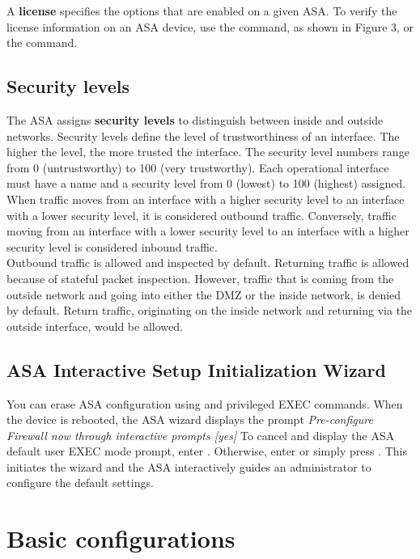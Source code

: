 A \textbf{license} specifies the options that are enabled on a given ASA. To verify the license information on an ASA device, use the  command, as shown in Figure 3, or the  command.\\

\subsection{Security levels}

The ASA assigns \textbf{security levels} to distinguish between inside and outside networks. Security levels define the level of trustworthiness of an interface. The higher the level, the more trusted the interface. The security level numbers range from 0 (untrustworthy) to 100 (very trustworthy). Each operational interface must have a name and a security level from 0 (lowest) to 100 (highest) assigned.\\

When traffic moves from an interface with a higher security level to an interface with a lower security level, it is considered outbound traffic. Conversely, traffic moving from an interface with a lower security level to an interface with a higher security level is considered inbound traffic.\\

Outbound traffic is allowed and inspected by default. Returning traffic is allowed because of stateful packet inspection. However, traffic that is coming from the outside network and going into either the DMZ or the inside network, is denied by default. Return traffic, originating on the inside network and returning via the outside interface, would be allowed. 

\subsection{ASA Interactive Setup Initialization Wizard}

You can erase ASA configuration using  and  privileged EXEC commands. When the device is rebooted, the ASA wizard displays the prompt \textit{Pre-configure Firewall now through interactive prompts [yes]} To cancel and display the ASA default user EXEC mode prompt, enter . Otherwise, enter  or simply press . This initiates the wizard and the ASA interactively guides an administrator to configure the default settings.

\section{Basic configurations}


